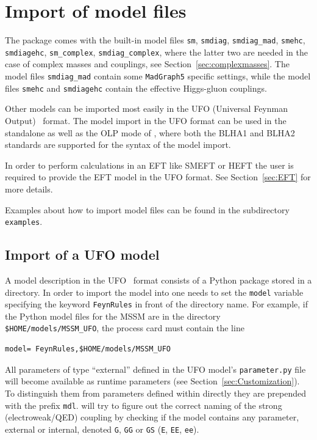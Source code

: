 \section{Import of model files}
\label{sec:model}

The \gosamv package comes with the built-in model files 
\texttt{sm}, \texttt{smdiag}, \texttt{smdiag\_mad}, \texttt{smehc}, \texttt{smdiagehc},
\texttt{sm\_complex}, \texttt{smdiag\_complex}, 
where the latter two are needed in the case of complex masses and couplings, 
see Section~\ref{sec:complexmasses}. 
The model files \texttt{smdiag\_mad} contain some \texttt{MadGraph5} specific settings, while
the model files \texttt{smehc} and \texttt{smdiagehc} contain the effective Higgs-gluon couplings.

Other models can be imported most easily in the UFO (Universal Feynman Output)~\cite{Degrande:2011ua,Darme:2023jdn} format.
The model import in the UFO format can be used in the standalone as well as the OLP 
mode of \gosam, where both the BLHA1 and BLHA2 standards are supported for the syntax of the model import.

In order to perform calculations in an EFT like SMEFT or HEFT the user is required to provide the EFT model in the UFO format. See Section~\ref{sec:EFT} for more details.

Examples about how to import model files can be found in the subdirectory 
 \texttt{examples}.

\subsection{Import of a UFO model}\label{sec:UFO}
A model description in the UFO~\cite{Degrande:2011ua,Darme:2023jdn} format consists of a Python package
stored in a directory. In order to import the model into \gosam{} one needs
to set the \texttt{model} variable specifying the keyword \texttt{FeynRules}
in front of the directory name.
For example, if the Python model files for the MSSM are in 
 the directory \\
 \texttt{\$HOME/models/MSSM\_UFO}, the process card must contain the line
\begin{lstlisting}[style=in]
model= FeynRules,$HOME/models/MSSM_UFO
\end{lstlisting}
All parameters of type ``external'' defined in the UFO model's \texttt{parameter.py} file will become available as runtime parameters (see Section~\ref{sec:Customization}). To distinguish them from parameters defined within \gosam directly they are prepended with the prefix \texttt{mdl}. \gosam will try to figure out the correct naming of the strong (electroweak/QED) coupling by checking if the model contains any parameter, external or internal, denoted \texttt{G}, \texttt{GG} or \texttt{GS} (\texttt{E}, \texttt{EE}, \texttt{ee}).


